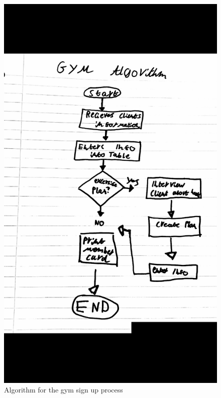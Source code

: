 \begin{figure}[H]
    \includegraphics[width=\textwidth]{GymAlgorithm.jpg}
    \caption{Algorithm for the gym sign up process} \label{fig:Algorithm for the gym sign up process}
\end{figure}

